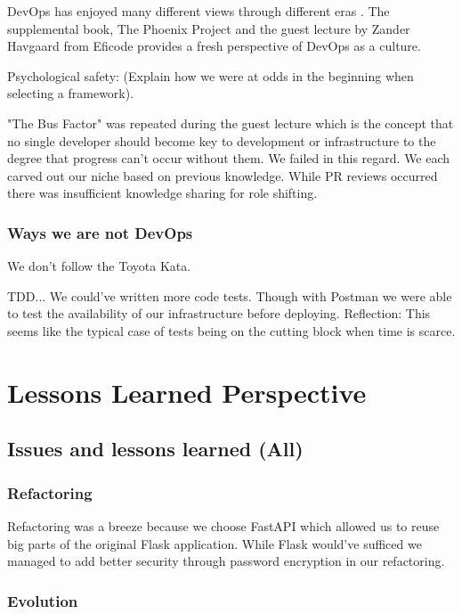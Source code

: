 \documentclass{article}
\begin{document}
DevOps has enjoyed many different views through different eras \cite{devopsviewsthrougheras}. The supplemental book, The Phoenix Project \cite{thephoenixproject} and the guest lecture by Zander Havgaard from Eficode provides a fresh perspective of DevOps as a culture. 


Psychological safety: (Explain how we were at odds in the beginning when selecting a framework). 

"The Bus Factor" was repeated during the guest lecture which is the concept that no single developer should become key to development or infrastructure to the degree that progress can't occur without them. We failed in this regard. We each carved out our niche based on previous knowledge. While PR reviews occurred there was insufficient knowledge sharing for role shifting. 

\subsubsection{Ways we are not DevOps}

We don't follow the Toyota Kata. 

TDD... We could've written more code tests. Though with Postman we were able to test the availability of our infrastructure before deploying. Reflection: This seems like the typical case of tests being on the cutting block when time is scarce. 


\section{Lessons Learned Perspective}

\subsection{Issues and lessons learned (All)}


\subsubsection{Refactoring} 

Refactoring was a breeze because we choose FastAPI which allowed us to reuse big parts of the original Flask application. While Flask would've sufficed we managed to add better security through password encryption in our refactoring. 

\subsubsection{Evolution}
\end{document}
